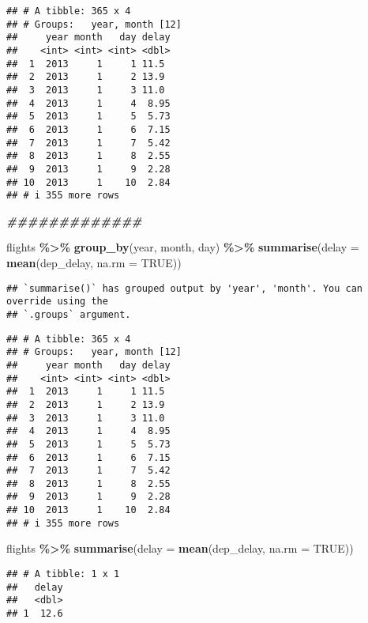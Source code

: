 \documentclass[
]{article}
\newenvironment{Shaded}{\begin{snugshade}}{\end{snugshade}}
\newcommand{\AttributeTok}[1]{\textcolor[rgb]{0.13,0.29,0.53}{#1}}
\newcommand{\ConstantTok}[1]{\textcolor[rgb]{0.56,0.35,0.01}{#1}}
\newcommand{\DocumentationTok}[1]{\textcolor[rgb]{0.56,0.35,0.01}{\textbf{\textit{#1}}}}
\newcommand{\FunctionTok}[1]{\textcolor[rgb]{0.13,0.29,0.53}{\textbf{#1}}}
\newcommand{\NormalTok}[1]{#1}
\newcommand{\SpecialCharTok}[1]{\textcolor[rgb]{0.81,0.36,0.00}{\textbf{#1}}}
\begin{document}
\begin{verbatim}
## # A tibble: 365 x 4
## # Groups:   year, month [12]
##     year month   day delay
##    <int> <int> <int> <dbl>
##  1  2013     1     1 11.5 
##  2  2013     1     2 13.9 
##  3  2013     1     3 11.0 
##  4  2013     1     4  8.95
##  5  2013     1     5  5.73
##  6  2013     1     6  7.15
##  7  2013     1     7  5.42
##  8  2013     1     8  2.55
##  9  2013     1     9  2.28
## 10  2013     1    10  2.84
## # i 355 more rows
\end{verbatim}

\begin{Shaded}
\begin{Highlighting}[]
\DocumentationTok{\#\#\#\#\#\#\#\#\#\#\#\#\#}

\NormalTok{flights }\SpecialCharTok{\%\textgreater{}\%} \FunctionTok{group\_by}\NormalTok{(year, month, day) }\SpecialCharTok{\%\textgreater{}\%}
            \FunctionTok{summarise}\NormalTok{(}\AttributeTok{delay =} \FunctionTok{mean}\NormalTok{(dep\_delay, }\AttributeTok{na.rm =} \ConstantTok{TRUE}\NormalTok{))}
\end{Highlighting}
\end{Shaded}

\begin{verbatim}
## `summarise()` has grouped output by 'year', 'month'. You can override using the
## `.groups` argument.
\end{verbatim}

\begin{verbatim}
## # A tibble: 365 x 4
## # Groups:   year, month [12]
##     year month   day delay
##    <int> <int> <int> <dbl>
##  1  2013     1     1 11.5 
##  2  2013     1     2 13.9 
##  3  2013     1     3 11.0 
##  4  2013     1     4  8.95
##  5  2013     1     5  5.73
##  6  2013     1     6  7.15
##  7  2013     1     7  5.42
##  8  2013     1     8  2.55
##  9  2013     1     9  2.28
## 10  2013     1    10  2.84
## # i 355 more rows
\end{verbatim}

\begin{Shaded}
\begin{Highlighting}[]
\NormalTok{flights }\SpecialCharTok{\%\textgreater{}\%} \FunctionTok{summarise}\NormalTok{(}\AttributeTok{delay =} \FunctionTok{mean}\NormalTok{(dep\_delay, }\AttributeTok{na.rm =} \ConstantTok{TRUE}\NormalTok{))}
\end{Highlighting}
\end{Shaded}

\begin{verbatim}
## # A tibble: 1 x 1
##   delay
##   <dbl>
## 1  12.6
\end{verbatim}
\end{document}
